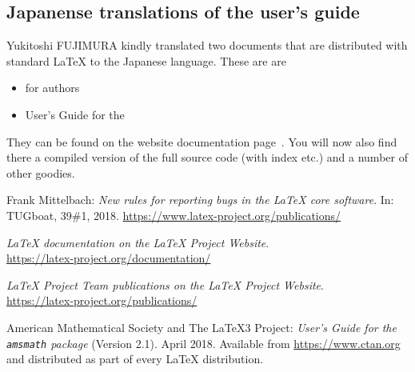 \documentclass{ltnews}
\begin{document}
\subsection{Japanense translations of the user's guide}

Yukitoshi FUJIMURA kindly translated two documents that are
distributed with standard \LaTeX{} to the Japanese language. These are
are
\begin{itemize}
\item
    \LaTeXe{} for authors
\item
    User’s Guide for the ~\cite{amsldoc}
\end{itemize}
They can be found on the website documentation page~\cite{site-doc}.
You will now also find there a compiled version of the full \LaTeXe{}
source code (with index etc.\@) and a number of other goodies.


      

\begin{thebibliography}{9}
  
 Frank Mittelbach:
  \emph{New rules for reporting bugs in the \LaTeX{} core software}.  
  In: TUGboat, 39\#1, 2018.
  \url{https://www.latex-project.org/publications/}

  \emph{\LaTeX{} documentation on the \LaTeX{} Project Website}.\\  
  \url{https://latex-project.org/documentation/}

  \emph{\LaTeX{} Project Team publications on the \LaTeX{} Project Website}.\\  
  \url{https://latex-project.org/publications/}

 American Mathematical Society and The \LaTeX3 Project:
  \emph{User's Guide for the \texttt{amsmath} package} (Version 2.1).  
  April 2018.
  Available from
  \url{https://www.ctan.org}
  and distributed as part of every \LaTeX{} distribution.

\end{thebibliography}
\end{document}
